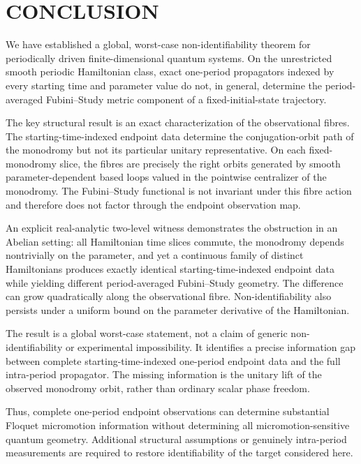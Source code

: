 \documentclass[twocolumn,prl,aps,floatfix]{revtex4-2}
\begin{document}
\section{CONCLUSION}

We have established a global, worst-case non-identifiability theorem for periodically driven finite-dimensional quantum systems. On the unrestricted smooth periodic Hamiltonian class, exact one-period propagators indexed by every starting time and parameter value do not, in general, determine the period-averaged Fubini--Study metric component of a fixed-initial-state trajectory.

The key structural result is an exact characterization of the observational fibres. The starting-time-indexed endpoint data determine the conjugation-orbit path of the monodromy but not its particular unitary representative. On each fixed-monodromy slice, the fibres are precisely the right orbits generated by smooth parameter-dependent based loops valued in the pointwise centralizer of the monodromy. The Fubini--Study functional is not invariant under this fibre action and therefore does not factor through the endpoint observation map.

An explicit real-analytic two-level witness demonstrates the obstruction in an Abelian setting: all Hamiltonian time slices commute, the monodromy depends nontrivially on the parameter, and yet a continuous family of distinct Hamiltonians produces exactly identical starting-time-indexed endpoint data while yielding different period-averaged Fubini--Study geometry. The difference can grow quadratically along the observational fibre. Non-identifiability also persists under a uniform bound on the parameter derivative of the Hamiltonian.

The result is a global worst-case statement, not a claim of generic non-identifiability or experimental impossibility. It identifies a precise information gap between complete starting-time-indexed one-period endpoint data and the full intra-period propagator. The missing information is the unitary lift of the observed monodromy orbit, rather than ordinary scalar phase freedom.

Thus, complete one-period endpoint observations can determine substantial Floquet micromotion information without determining all micromotion-sensitive quantum geometry. Additional structural assumptions or genuinely intra-period measurements are required to restore identifiability of the target considered here.




\end{document}
